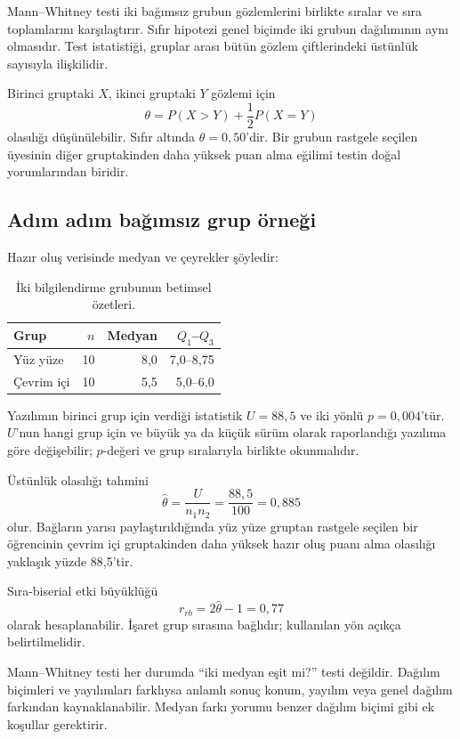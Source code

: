 Mann--Whitney testi iki bağımsız grubun gözlemlerini birlikte sıralar ve sıra
toplamlarını karşılaştırır. Sıfır hipotezi genel biçimde iki grubun dağılımının
aynı olmasıdır. Test istatistiği, gruplar arası bütün gözlem çiftlerindeki
üstünlük sayısıyla ilişkilidir.

Birinci gruptaki $X$, ikinci gruptaki $Y$ gözlemi için
\[
\theta=P(X>Y)+\frac12P(X=Y)
\]
olasılığı düşünülebilir. Sıfır altında $\theta=0{,}50$'dir. Bir grubun rastgele
seçilen üyesinin diğer gruptakinden daha yüksek puan alma eğilimi testin doğal
yorumlarından biridir.

\subsection{Adım adım bağımsız grup örneği}

Hazır oluş verisinde medyan ve çeyrekler şöyledir:

\begin{table}[htbp]
\centering
\caption{İki bilgilendirme grubunun betimsel özetleri.}
\begin{tabular}{@{}lrrr@{}}
\toprule
Grup & $n$ & Medyan & $Q_1$--$Q_3$ \\
\midrule
Yüz yüze & 10 & 8,0 & 7,0--8,75 \\
Çevrim içi & 10 & 5,5 & 5,0--6,0 \\
\bottomrule
\end{tabular}
\end{table}

Yazılımın birinci grup için verdiği istatistik $U=88{,}5$ ve iki yönlü
$p=0{,}004$'tür. $U$'nun hangi grup için ve büyük ya da küçük sürüm olarak
raporlandığı yazılıma göre değişebilir; $p$-değeri ve grup sıralarıyla birlikte
okunmalıdır.

Üstünlük olasılığı tahmini
\[
\hat\theta=\frac{U}{n_1n_2}
=\frac{88{,}5}{100}=0{,}885
\]
olur. Bağların yarısı paylaştırıldığında yüz yüze gruptan rastgele seçilen bir
öğrencinin çevrim içi gruptakinden daha yüksek hazır oluş puanı alma olasılığı
yaklaşık yüzde 88,5'tir.

Sıra-biserial etki büyüklüğü
\[
r_{rb}=2\hat\theta-1=0{,}77
\]
olarak hesaplanabilir. İşaret grup sırasına bağlıdır; kullanılan yön açıkça
belirtilmelidir.

\begin{mistakebox}
Mann--Whitney testi her durumda ``iki medyan eşit mi?'' testi değildir.
Dağılım biçimleri ve yayılımları farklıysa anlamlı sonuç konum, yayılım veya
genel dağılım farkından kaynaklanabilir. Medyan farkı yorumu benzer dağılım
biçimi gibi ek koşullar gerektirir.
\end{mistakebox}

